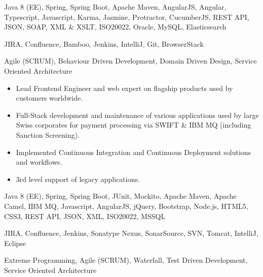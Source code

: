 \medskip
\begin{description}
	\ifincludestech
	\item [Technologies] Java 8 (EE), Spring, Spring Boot, Apache Maven, AngularJS, Angular, Typescript, Javascript, Karma, Jasmine, Protractor, CucumberJS, REST API, JSON, SOAP, XML \& XSLT, ISO20022, Oracle, MySQL, Elasticsearch
	\fi
	\ifincludestools
	\item [Tools] JIRA, Confluence, Bamboo, Jenkins, IntelliJ, Git, BrowserStack
	\fi
	\ifincludesmethods
	\item [Methodologies] Agile (SCRUM), Behaviour Driven Development, Domain Driven Design, Service Oriented Architecture
	\fi
\end{description}

\divider


\medskip
\begin{itemize}
	\item Lead Frontend Engineer and web expert on flagship products used by customers worldwide.
	\item Full-Stack development and maintenance of various applications used by large Swiss corporates for payment processing via SWIFT \& IBM MQ (including Sanction Screening).
	\item Implemented Continuous Integration and Continuous Deployment solutions and workflows. 
	\item 3rd level support of legacy applications.
\end{itemize}

\medskip
\begin{description}
	\ifincludestech
	\item [Technologies] Java 8 (EE), Spring, Spring Boot, JUnit, Mockito, Apache Maven, Apache Camel, IBM MQ, Javascript, AngularJS, jQuery, Bootstrap, Node.js, HTML5, CSS3, REST API, JSON, XML, ISO20022, MSSQL
	\fi
	\ifincludestools
	\item [Tools] JIRA, Confluence, Jenkins, Sonatype Nexus, SonarSource, SVN, Tomcat, IntelliJ, Eclipse
	\fi
	\ifincludesmethods
	\item [Methodologies] Extreme Programming, Agile (SCRUM), Waterfall, Test Driven Development, Service Oriented Architecture
	\fi
\end{description}

\divider

\newpage
{}

